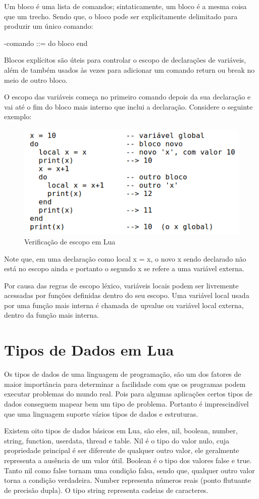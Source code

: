 \documentclass[
12pt, %
openright, %
oneside, %
a4paper, %
english, %
brazil, %
]{abntex2}
\begin{document}
Um bloco é uma lista de comandos; sintaticamente, um bloco é a mesma coisa que um trecho. Sendo que, o bloco pode ser explicitamente delimitado para produzir um único comando:

-comando ::= do bloco end

Blocos explícitos são úteis para controlar o escopo de declarações de variáveis, além de também usados às vezes para adicionar um comando return ou break no meio de outro bloco.

O escopo das variáveis começa no primeiro comando depois da sua declaração e vai até o fim do bloco mais interno que inclui a declaração. Considere o seguinte exemplo:

\begin{figure}[H]
\centering
\includegraphics[width=0.5\linewidth]{imagens/imagem3.png}
\caption{Verificação de escopo em Lua \cite{Lua_Org}}
\end{figure}

Note que, em uma declaração como local x = x, o novo x sendo declarado não está no escopo ainda e portanto o segundo x se refere a uma variável externa.

Por causa das regras de escopo léxico, variáveis locais podem ser livremente acessadas por funções definidas dentro do seu escopo. Uma variável local usada por uma função mais interna é chamada de upvalue ou variável local externa, dentro da função mais interna.

\chapter{Tipos de Dados em Lua}
Os tipos de dados de uma linguagem de programação, são um dos fatores de maior importância para determinar a facilidade com que os programas podem executar problemas do mundo real. Pois para algumas aplicações certos tipos de dados conseguem mapear bem um tipo de problema. Portanto é imprescindível que uma linguagem suporte vários tipos de dados e estruturas.

Existem oito tipos de dados básicos em Lua, são eles, nil, boolean, number, string, function, userdata, thread e table. Nil é o tipo do valor nulo, cuja propriedade principal é ser diferente de qualquer outro valor, ele geralmente representa a ausência de um valor útil. Boolean é o tipo dos valores false e true. Tanto nil como false tornam uma condição falsa, sendo que, qualquer outro valor torna a condição verdadeira. Number representa números reais (ponto flutuante de precisão dupla). O tipo string representa cadeias de caracteres.
\end{document}
